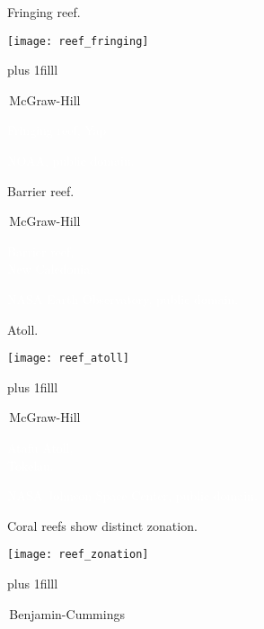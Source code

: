 \documentclass[t,handout]{beamer}  %
\begin{document}
\begin{frame}[t]{Fringing reef.}

\texttt{[image: reef\_fringing]}

\vskip0pt plus 1filll

\tiny\textcopyright\,McGraw-Hill
\end{frame}


{
\begin{frame}[b]{\hfill\textcolor{white}{Fringing reef, Yap}}

\hfill\tiny\textcolor{white}{NOAA, public domain.}
\end{frame}
}

{
\begin{frame}[b]{Barrier reef.}

\tiny\hfill\textcopyright\,McGraw-Hill
\end{frame}
}

{
\begin{frame}[b]{\hfill\textcolor{white}{Barrier reef, \\\hfill New Caledonia.}}

\tiny\textcolor{white}{NASA Earth Observatory, public domain.}
\end{frame}
}

\begin{frame}[t]{Atoll.}

\texttt{[image: reef\_atoll]}

\vskip0pt plus 1filll

\tiny\textcopyright\,McGraw-Hill
\end{frame}

{
\begin{frame}[b]{\hfill\textcolor{white}{Atafu Atoll, \\\hfill Tokelau.}}

\tiny\textcolor{white}{NASA Johnson Space Center, public domain.}
\end{frame}
}

\begin{frame}[t]{Coral reefs show distinct zonation.}

\texttt{[image: reef\_zonation]}

\vskip0pt plus 1filll

\tiny\textcopyright\,Benjamin-Cummings
\end{frame}
\end{document}
